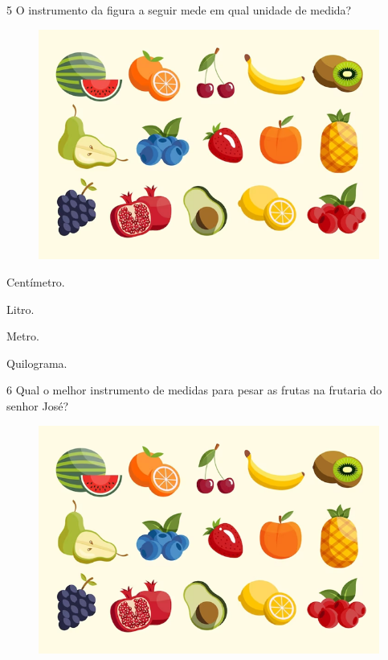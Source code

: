 \num{5} O instrumento da figura a seguir mede em qual unidade de medida?

\begin{figure}[htpb!]
\includegraphics[width=\textwidth]{./media/image153.png}
\end{figure}

\begin{minipage}{.5\textwidth}
\begin{escolha}
\item Centímetro.

\item Litro.

\item Metro.

\item Quilograma.
\end{escolha}
\end{minipage}

\num{6} Qual o melhor instrumento de medidas para pesar as frutas na frutaria do
senhor José?

\begin{figure}[htpb!]
\includegraphics[width=\textwidth]{./media/image154.png}
\end{figure}

